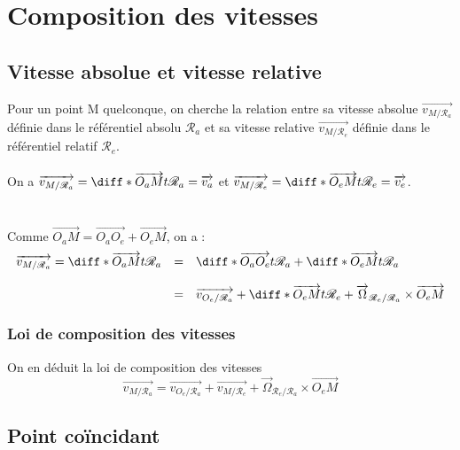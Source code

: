 \documentclass[a4paper,10pt]{book} %
\begin{document}
\section{Composition des vitesses}
\subsection{Vitesse absolue et vitesse relative}
Pour un point M quelconque, on cherche la relation entre sa vitesse absolue $\overrightarrow{v_{M/\mathcal{R}_a}}$ définie dans le référentiel absolu $\mathcal{R}_a$ et sa vitesse relative $\overrightarrow{v_{M/\mathcal{R}_e}}$ définie dans le référentiel relatif $\mathcal{R}_e$. \\\\

On a $\overrightarrow{v_{M/\mathcal{R}_a}}=\diff*{\overrightarrow{O_aM}}{t}{\mathcal{R}_a}=\overrightarrow{v_a}$ et $\overrightarrow{v_{M/\mathcal{R}_e}}=\diff*{\overrightarrow{O_eM}}{t}{\mathcal{R}_e}=\overrightarrow{v_e}$.\\\\\\

Comme $\overrightarrow{O_aM}=\overrightarrow{O_aO_e}+\overrightarrow{O_eM}$, on a :
$$\begin{array}{rcl}\overrightarrow{v_{M/\mathcal{R}_a}}=\diff*{\overrightarrow{O_aM}}{t}{\mathcal{R}_a}
&=&\diff*{\overrightarrow{O_aO_e}}{t}{\mathcal{R}_a}+ \diff*{\overrightarrow{O_eM}}{t}{\mathcal{R}_a}\\\\
&=&\overrightarrow{v_{O_e/\mathcal{R}_a}}+\diff*{\overrightarrow{O_eM}}{t}{\mathcal{R}_e}+\overrightarrow{\Omega}_{\mathcal{R}_e/\mathcal{R}_a}\times \overrightarrow{O_eM}\end{array}$$

\subsubsection{Loi de composition des vitesses}
On en déduit la loi de composition des vitesses $$\overrightarrow{v_{M/\mathcal{R}_a}}=\overrightarrow{v_{O_e/\mathcal{R}_a}}+\overrightarrow{v_{M/\mathcal{R}_e}}+\overrightarrow{\Omega}_{\mathcal{R}_e/\mathcal{R}_a}\times \overrightarrow{O_eM}$$

\newpage

\subsection{Point coïncidant}
\end{document}
